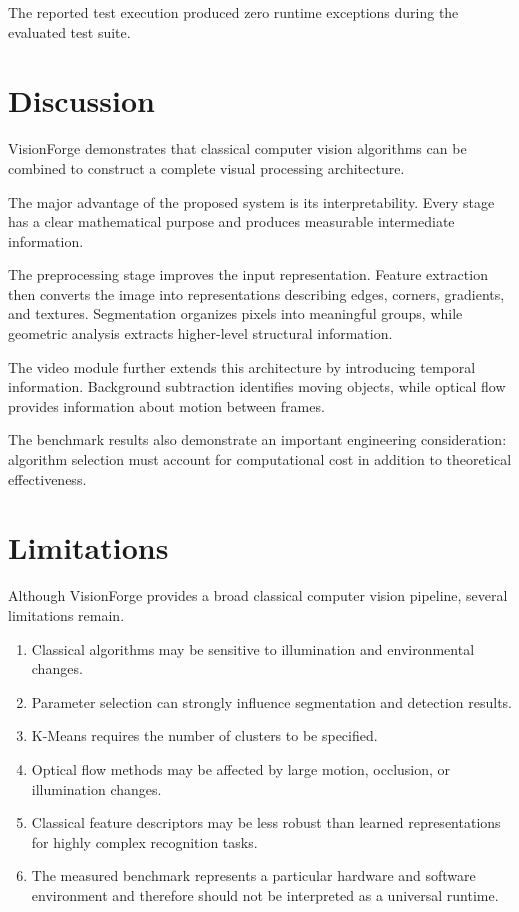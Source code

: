 \documentclass[11pt,a4paper]{article}
\begin{document}
The reported test execution produced zero runtime exceptions during the evaluated test suite.


\section{Discussion}

VisionForge demonstrates that classical computer vision algorithms can be combined to construct a complete visual processing architecture.

The major advantage of the proposed system is its interpretability. Every stage has a clear mathematical purpose and produces measurable intermediate information.

The preprocessing stage improves the input representation. Feature extraction then converts the image into representations describing edges, corners, gradients, and textures. Segmentation organizes pixels into meaningful groups, while geometric analysis extracts higher-level structural information.

The video module further extends this architecture by introducing temporal information. Background subtraction identifies moving objects, while optical flow provides information about motion between frames.

The benchmark results also demonstrate an important engineering consideration: algorithm selection must account for computational cost in addition to theoretical effectiveness.


\section{Limitations}

Although VisionForge provides a broad classical computer vision pipeline, several limitations remain.

\begin{enumerate}
    \item Classical algorithms may be sensitive to illumination and environmental changes.
    \item Parameter selection can strongly influence segmentation and detection results.
    \item K-Means requires the number of clusters to be specified.
    \item Optical flow methods may be affected by large motion, occlusion, or illumination changes.
    \item Classical feature descriptors may be less robust than learned representations for highly complex recognition tasks.
    \item The measured benchmark represents a particular hardware and software environment and therefore should not be interpreted as a universal runtime.
\end{enumerate}
\end{document}
